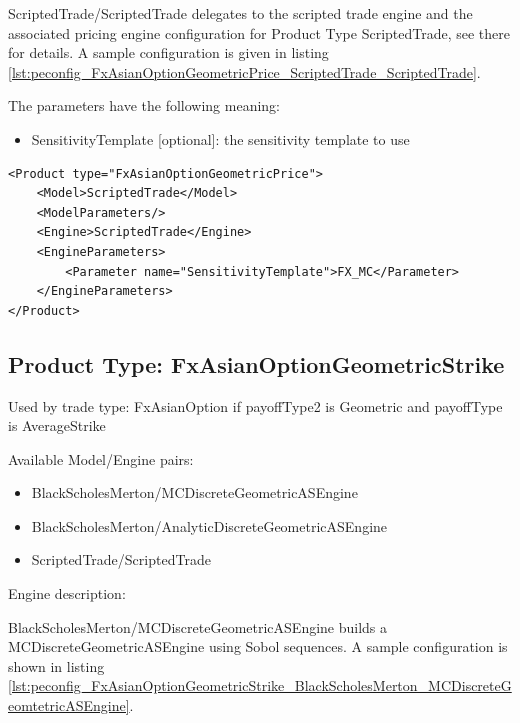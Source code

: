 ScriptedTrade/ScriptedTrade delegates to the scripted trade engine and the associated pricing engine configuration for
Product Type ScriptedTrade, see there for details. A sample configuration is given in listing
\ref{lst:peconfig_FxAsianOptionGeometricPrice_ScriptedTrade_ScriptedTrade}.

The parameters have the following meaning:

\begin{itemize}
\item SensitivityTemplate [optional]: the sensitivity template to use
\end{itemize}

\begin{longlisting}
\begin{verbatim}
<Product type="FxAsianOptionGeometricPrice">
    <Model>ScriptedTrade</Model>
    <ModelParameters/>
    <Engine>ScriptedTrade</Engine>
    <EngineParameters>
        <Parameter name="SensitivityTemplate">FX_MC</Parameter>
    </EngineParameters>
</Product>
\end{verbatim}
\caption{Configuration for Product FxAsianOptionGeometricPrice, Model ScriptedTrade, Engine ScriptedTrade}
\label{lst:peconfig_FxAsianOptionGeometricPrice_ScriptedTrade_ScriptedTrade}
\end{longlisting}

\subsection{Product Type: FxAsianOptionGeometricStrike}

Used by trade type: FxAsianOption if payoffType2 is Geometric and payoffType is AverageStrike

Available Model/Engine pairs:

\begin{itemize}
  \item BlackScholesMerton/MCDiscreteGeometricASEngine
  \item BlackScholesMerton/AnalyticDiscreteGeometricASEngine
  \item ScriptedTrade/ScriptedTrade
\end{itemize}

Engine description:

BlackScholesMerton/MCDiscreteGeometricASEngine builds a MCDiscreteGeometricASEngine using Sobol sequences. A sample
configuration is shown in listing
\ref{lst:peconfig_FxAsianOptionGeometricStrike_BlackScholesMerton_MCDiscreteGeomtetricASEngine}.

